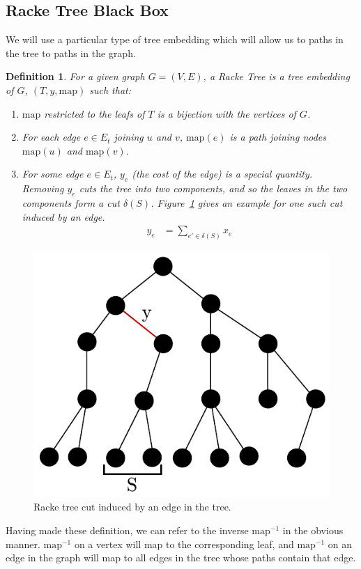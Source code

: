 \documentclass[12pt]{article}
\newtheorem{definition}{Definition}
\begin{document}
\subsection{Racke Tree Black Box}

We will use a particular type of tree embedding which will allow us to paths in the tree to paths in the graph. 

\begin{definition}
For a given graph $G = (V, E)$, a Racke Tree is a tree embedding of $G$, $(T, y, \text{map})$ such that:
\begin{enumerate}
\item $\text{map}$ restricted to the leafs of $T$ is a bijection with the vertices of $G$.
\item For each edge $e \in E_t$ joining $u$ and $v$, $\text{map}(e)$ is a path joining nodes $\text{map}(u)$ and $\text{map}(v)$.
\item For some edge $e \in E_t$, $y_e$ (the cost of the edge) is a special quantity. Removing $y_e$ cuts the tree into two components, and so the leaves in the two components form a cut $\delta(S)$. Figure~\ref{fig:rackecut} gives an example for one such cut induced by an edge.
\begin{align}
y_e &= \sum_{e' \in \delta(S)} x_e
\end{align}
\end{enumerate}
\end{definition}

\begin{figure}
\centering
\label{fig:rackecut}
\includegraphics[width=0.5\linewidth]{Rackecut.pdf}
\caption{Racke tree cut induced by an edge in the tree.}
\end{figure}

Having made these definition, we can refer to the inverse $\text{map}^{-1}$ in the obvious manner. $\text{map}^{-1}$ on a vertex will map to the corresponding leaf, and $\text{map}^{-1}$ on an edge in the graph will map to all edges in the tree whose paths contain that edge. 
\end{document}
